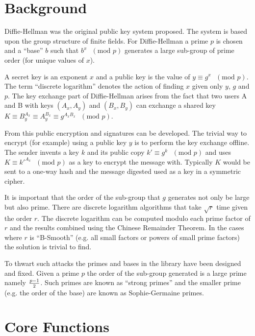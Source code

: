 \documentclass[synpaper]{book}
\begin{document}
\section{Background}

Diffie-Hellman was the original public key system proposed.  The system is based upon the group structure
of finite fields.  For Diffie-Hellman a prime $p$ is chosen and a ``base'' $b$ such that $b^x\mbox{ }(\mbox{mod }p)$
generates a large sub-group of prime order (for unique values of $x$).

A secret key is an exponent $x$ and a public key is the value of $y \equiv g^x\mbox{ }(\mbox{mod }p)$.  The term
``discrete logarithm'' denotes the action of finding $x$ given only $y$, $g$ and $p$.  The key exchange part of
Diffie-Hellman arises from the fact that two users A and B with keys $(A_x, A_y)$ and $(B_x, B_y)$ can exchange
a shared key $K \equiv B_y^{A_x} \equiv A_y^{B_x} \equiv g^{A_xB_x}\mbox{ }(\mbox{mod }p)$.

From this public encryption and signatures can be developed.  The trivial way to encrypt (for example) using a public key
$y$ is to perform the key exchange offline.  The sender invents a key $k$ and its public copy
$k' \equiv g^k\mbox{ }(\mbox{mod }p)$ and uses $K \equiv k'^{A_x}\mbox{ }(\mbox{mod }p)$ as a key to encrypt
the message with.  Typically $K$ would be sent to a one-way hash and the message digested used as a key in a
symmetric cipher.

It is important that the order of the sub-group that $g$ generates not only be large but also prime.  There are
discrete logarithm algorithms that take $\sqrt r$ time given the order $r$.  The discrete logarithm can be computed
modulo each prime factor of $r$ and the results combined using the Chinese Remainder Theorem.  In the cases where
$r$ is ``B-Smooth'' (e.g. all small factors or powers of small prime factors) the solution is trivial to find.

To thwart such attacks the primes and bases in the library have been designed and fixed.  Given a prime $p$ the order of
 the sub-group generated is a large prime namely ${p - 1} \over 2$.  Such primes are known as ``strong primes'' and the
smaller prime (e.g. the order of the base) are known as Sophie-Germaine primes.

\section{Core Functions}
\end{document}
